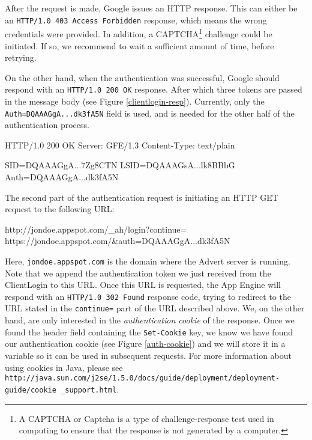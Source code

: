 After the request is made, Google issues an HTTP response. This can either be
an \texttt{HTTP/1.0 403 Access Forbidden} response, which means the wrong
credentials were provided. In addition, a CAPTCHA\footnote{A CAPTCHA or Captcha
is a type of challenge-response test used in computing to ensure that the
response is not generated by a computer.} challenge could be initiated. If so,
we recommend to wait a sufficient amount of time, before retrying.

On the other hand, when the authentication was successful, Google should respond
with an \texttt{HTTP/1.0 200 OK} response. After which three tokens are passed
in the message body (see Figure \ref{clientlogin-resp}). Currently, only the
\texttt{Auth=DQAAAGgA...dk3fA5N} field is used, and is needed for the other
half of the authentication process.

\begin{figure*}[ht] %
\begin{center}
\begin{code}
HTTP/1.0 200 OK
Server: GFE/1.3
Content-Type: text/plain

SID=DQAAAGgA...7Zg8CTN
LSID=DQAAAGsA...lk8BBbG
Auth=DQAAAGgA...dk3fA5N
\end{code}
\caption{ClientLogin Response.\label{clientlogin-resp}}
\end{center}
\end{figure*}

The second part of the authentication request is initiating an HTTP GET request
to the following URL:

\begin{center}
\begin{code}
http://jondoe.appspot.com/_ah/login?continue=
    https://jondoe.appspot.com/&auth=DQAAAGgA...dk3fA5N
\end{code}
\end{center}

Here, \texttt{jondoe.appspot.com} is the domain where the Advert server is
running. Note that we append the authentication token we just received from the
ClientLogin to this URL. Once this URL is requested, the App Engine will
respond with an \texttt{HTTP/1.0 302 Found} response code, trying to redirect
to the URL stated in the \texttt{continue=} part of the URL described above.
We, on the other hand, are only interested in the \emph{authentication cookie}
of the response. Once we found the header field containing the
\texttt{Set-Cookie} key, we know we have found our authentication cookie (see
Figure \ref{auth-cookie}) and we will store it in a variable so it can be used
in subsequent requests. For more information about using cookies in Java,
please see
\texttt{
http://java.sun.com/j2se/1.5.0/docs/guide/deployment/deployment-guide/cookie
\_support.html}.

